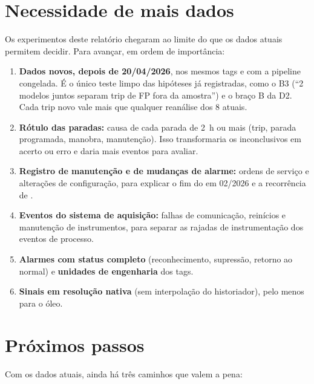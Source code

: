 \documentclass[11pt,a4paper]{article}
\newcommand{\tg}[1]{\texttt{\detokenize{#1}}}
\begin{document}
\section{Necessidade de mais dados}
\label{sec:mais-dados}

Os experimentos deste relatório chegaram ao limite do que os dados atuais permitem decidir. Para avançar, em ordem
de importância:

\begin{enumerate}
  \item \textbf{Dados novos, depois de 20/04/2026}, nos mesmos tags e com a pipeline congelada. É o único teste
        limpo das hipóteses já registradas, como o B3 (``2 modelos juntos separam trip de FP fora da amostra'') e o
        braço B da D2. Cada trip novo vale mais que qualquer reanálise dos 8 atuais.
  \item \textbf{Rótulo das paradas:} causa de cada parada de 2~h ou mais (trip, parada programada, manobra,
        manutenção). Isso transformaria os inconclusivos em acerto ou erro e daria mais eventos para avaliar.
  \item \textbf{Registro de manutenção e de mudanças de alarme:} ordens de serviço e alterações de configuração,
        para explicar o fim do \tg{PI_6240319_AL} em 02/2026 e a recorrência de \tg{PAL_6240315}.
  \item \textbf{Eventos do sistema de aquisição:} falhas de comunicação, reinícios e manutenção de instrumentos,
        para separar as rajadas de instrumentação dos eventos de processo.
  \item \textbf{Alarmes com status completo} (reconhecimento, supressão, retorno ao normal) e \textbf{unidades de
        engenharia} dos tags.
  \item \textbf{Sinais em resolução nativa} (sem interpolação do historiador), pelo menos para o óleo.
\end{enumerate}

\section{Próximos passos}
\label{sec:proximos}

Com os dados atuais, ainda há três caminhos que valem a pena:
\end{document}
